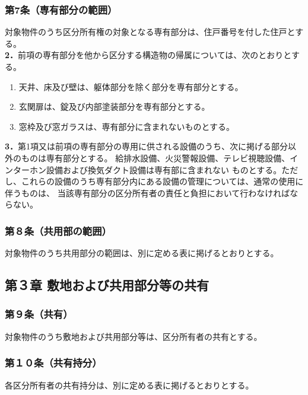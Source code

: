 \documentclass[12pt,uplatex,dvipdfmx]{jsarticle}
\begin{document}
\subsubsection*{ 第7条（専有部分の範囲）}
対象物件のうち区分所有権の対象となる専有部分は、住戸番号を付した住戸とする。\\
\textbf{2．}前項の専有部分を他から区分する構造物の帰属については、次のとおりとする。
\begin{enumerate}
\item 天井、床及び壁は、躯体部分を除く部分を専有部分とする。
\item 玄関扉は、錠及び内部塗装部分を専有部分とする。
\item 窓枠及び窓ガラスは、専有部分に含まれないものとする。 
\end{enumerate}
\textbf{3．}第1項又は前項の専有部分の専用に供される設備のうち、次に掲げる部分以外のものは専有部分とする。
給排水設備、火災警報設備、テレビ視聴設備、インターホン設備および換気ダクト設備は専有部に含まれない
ものとする。ただし、これらの設備のうち専有部分内にある設備の管理については、通常の使用に伴うものは、
当該専有部分の区分所有者の責任と負担において行わなければならない。
\subsubsection*{第８条（共用部の範囲）}
対象物件のうち共用部分の範囲は、別に定める表に掲げるとおりとする。

\begin{center}
\subsection*{第３章 敷地および共用部分等の共有}
\end{center}
\subsubsection*{第９条（共有）}
対象物件のうち敷地および共用部分等は、区分所有者の共有とする。
\subsubsection*{第１０条（共有持分）}
各区分所有者の共有持分は、別に定める表に掲げるとおりとする。
\end{document}
